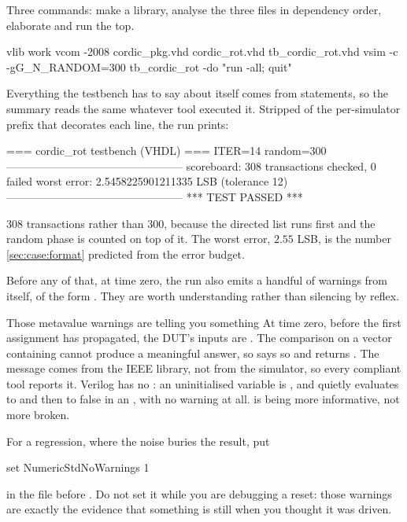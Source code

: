 Three commands: make a library, analyse the three files in dependency order,
elaborate and run the top.

\begin{shcode}
vlib work
vcom -2008 cordic_pkg.vhd cordic_rot.vhd tb_cordic_rot.vhd
vsim -c -gG_N_RANDOM=300 tb_cordic_rot -do "run -all; quit"
\end{shcode}

Everything the testbench has to say about itself comes from 
statements, so the summary reads the same whatever tool executed it. Stripped
of the per-simulator prefix that decorates each line, the run prints:

\begin{txtcode}
=== cordic_rot testbench (VHDL) ===
ITER=14  random=300
------------------------------------------------
scoreboard: 308 transactions checked, 0 failed
worst error: 2.5458225901211335 LSB (tolerance 12)
------------------------------------------------
*** TEST PASSED ***
\end{txtcode}

308 transactions rather than 300, because the directed list runs first and the
random phase is counted on top of it. The worst error, $2.55$ LSB, is the
number \cref{sec:case:format} predicted from the error budget.

Before any of that, at time zero, the run also emits a handful of warnings
from  itself, of the form
. They are worth
understanding rather than silencing by reflex.

\begin{notebox}{Those metavalue warnings are \VHDL{} telling you something}
At time zero, before the first assignment has propagated, the DUT's inputs
are . The comparison  on a vector
containing  cannot produce a meaningful answer, so
 says so and returns . The message comes from
the IEEE library, not from the simulator, so every compliant tool reports it.
Verilog has no : an uninitialised variable is , and
 quietly evaluates to  and then to false in an ,
with no warning at all. \VHDL{} is being more informative, not more broken.

For a regression, where the noise buries the result, put

\begin{tclcode}
set NumericStdNoWarnings 1
\end{tclcode}

in the  file before . Do not set it while you are
debugging a reset: those warnings are exactly the evidence that something is
still  when you thought it was driven.
\end{notebox}

